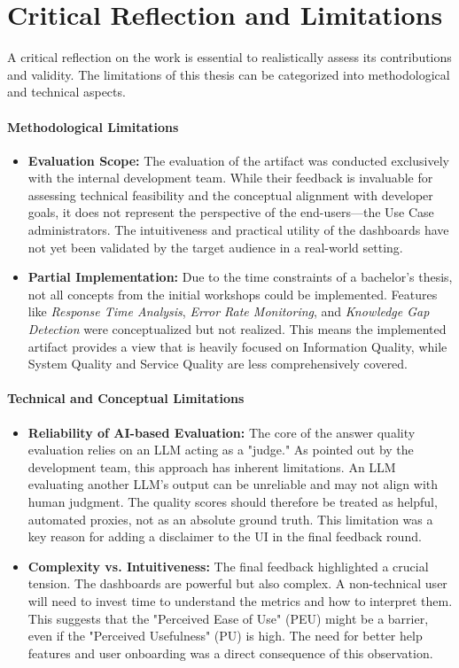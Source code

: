 \documentclass[
	english,
	ruledheaders=section,%
	class=report,%
	thesis={type=bachelor},%
	accentcolor=1b,%
	custommargins=true,%
	marginpar=false,%
	parskip=half-,%
	fontsize=11pt,%
	DIV=14,
]{tudapub}
\begin{document}
\section{Critical Reflection and Limitations}
A critical reflection on the work is essential to realistically assess its contributions and validity. The limitations of this thesis can be categorized into methodological and technical aspects.

\paragraph{Methodological Limitations}
\begin{itemize}
    \item \textbf{Evaluation Scope:} The evaluation of the artifact was conducted exclusively with the internal development team. While their feedback is invaluable for assessing technical feasibility and the conceptual alignment with developer goals, it does not represent the perspective of the end-users—the Use Case administrators. The intuitiveness and practical utility of the dashboards have not yet been validated by the target audience in a real-world setting.
    \item \textbf{Partial Implementation:} Due to the time constraints of a bachelor's thesis, not all concepts from the initial workshops could be implemented. Features like \textit{Response Time Analysis}, \textit{Error Rate Monitoring}, and \textit{Knowledge Gap Detection} were conceptualized but not realized. This means the implemented artifact provides a view that is heavily focused on Information Quality, while System Quality and Service Quality are less comprehensively covered.
\end{itemize}

\paragraph{Technical and Conceptual Limitations}
\begin{itemize}
    \item \textbf{Reliability of AI-based Evaluation:} The core of the answer quality evaluation relies on an LLM acting as a "judge." As pointed out by the development team, this approach has inherent limitations. An LLM evaluating another LLM's output can be unreliable and may not align with human judgment. The quality scores should therefore be treated as helpful, automated proxies, not as an absolute ground truth. This limitation was a key reason for adding a disclaimer to the UI in the final feedback round.
    \item \textbf{Complexity vs. Intuitiveness:} The final feedback highlighted a crucial tension. The dashboards are powerful but also complex. A non-technical user will need to invest time to understand the metrics and how to interpret them. This suggests that the "Perceived Ease of Use" (PEU) might be a barrier, even if the "Perceived Usefulness" (PU) is high. The need for better help features and user onboarding was a direct consequence of this observation.
\end{itemize}
\end{document}

